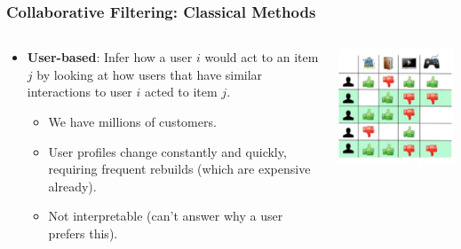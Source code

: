 \documentclass[11pt]{beamer}
\begin{document}
	\begin{frame}
		\frametitle{Collaborative Filtering: Classical Methods}
		\begin{columns}
			\begin{column}{0.5\textwidth}
				\begin{itemize}
					\item \textbf{User-based}: Infer how a user $i$ would act to an item $j$ by looking at how users that have similar interactions to user $i$ acted to item $j$.
					\begin{itemize}
						\item<2-> We have millions of customers.
						\item<3-> User profiles change constantly and quickly, requiring frequent rebuilds (which are expensive already).
						\item<4-> Not interpretable (can't answer why a user prefers this).
					\end{itemize}
				\end{itemize}
			\end{column}
			\begin{column}{0.5\textwidth}
				\begin{center}
					\centering
					\includegraphics[width=\textwidth]{images/cf-stage3.png}
				\end{center}
			\end{column}
		\end{columns}
	\end{frame}
\end{document}
